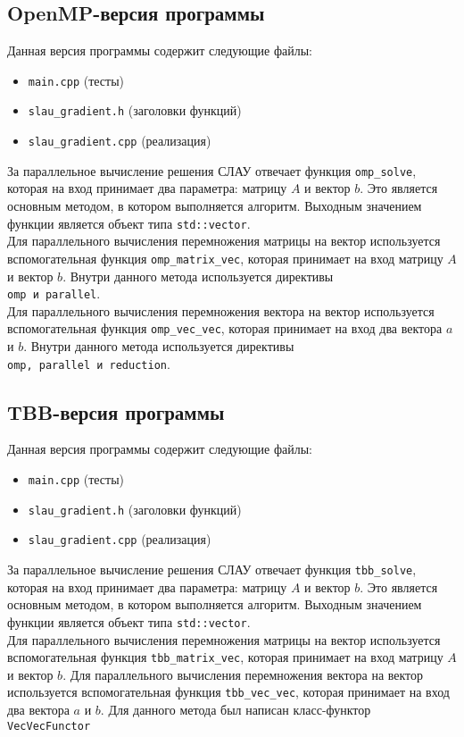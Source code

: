 \documentclass[14pt, russian]{extarticle}
\begin{document}
        \subsection{OpenMP-версия программы}
        Данная версия программы содержит следующие файлы:
        \begin{itemize}
            \item \verb|main.cpp| (тесты)
            \item \verb|slau_gradient.h| (заголовки функций)
            \item \verb|slau_gradient.cpp| (реализация)
        \end{itemize}
        За параллельное вычисление решения СЛАУ отвечает функция \verb|omp_solve|, которая на вход принимает два параметра: матрицу $A$ и вектор $b$. Это является основным методом, в котором выполняется алгоритм. Выходным значением функции является объект типа \verb|std::vector|.\\
        Для параллельного вычисления перемножения матрицы на вектор используется вспомогательная функция \verb|omp_matrix_vec|, которая принимает на вход матрицу $A$ и вектор $b$. Внутри данного метода используется директивы \\\verb|omp и parallel|. \\
        Для параллельного вычисления перемножения вектора на вектор используется вспомогательная функция \verb|omp_vec_vec|, которая принимает на вход два вектора $a$ и $b$. Внутри данного метода используется директивы \\\verb|omp, parallel и reduction|. \\

        \newpage
        \subsection{TBB-версия программы}
        Данная версия программы содержит следующие файлы:
        \begin{itemize}
            \item \verb|main.cpp| (тесты)
            \item \verb|slau_gradient.h| (заголовки функций)
            \item \verb|slau_gradient.cpp| (реализация)
        \end{itemize}
        За параллельное вычисление решения СЛАУ отвечает функция \verb|tbb_solve|, которая на вход принимает два параметра: матрицу $A$ и вектор $b$. Это является основным методом, в котором выполняется алгоритм. Выходным значением функции является объект типа \verb|std::vector|.\\
        Для параллельного вычисления перемножения матрицы на вектор используется вспомогательная функция \verb|tbb_matrix_vec|, которая принимает на вход матрицу $A$ и вектор $b$. 
        Для параллельного вычисления перемножения вектора на вектор используется вспомогательная функция \verb|tbb_vec_vec|, которая принимает на вход два вектора $a$ и $b$. Для данного метода был написан класс-функтор
        \verb|VecVecFunctor|
\end{document}

